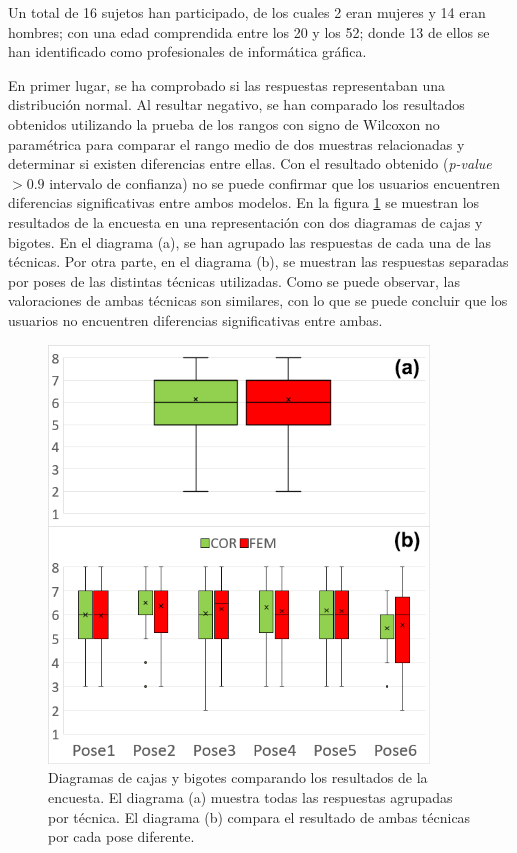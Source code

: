 Un total de 16 sujetos han participado, de los cuales 2 eran mujeres y 14 eran hombres;
con una edad comprendida entre los 20 y los 52; donde 13 de ellos se han identificado como profesionales de informática gráfica.


En primer lugar, se ha comprobado si las respuestas representaban una distribución normal. Al resultar negativo, se han comparado los resultados obtenidos utilizando la prueba de los rangos con signo de Wilcoxon no paramétrica para comparar el rango medio de dos muestras relacionadas y determinar si existen diferencias entre ellas. Con el resultado obtenido (\emph{p-value} $> 0.9$ intervalo de confianza) no se puede confirmar que los usuarios encuentren diferencias significativas entre ambos modelos. 
En la figura \ref{fig:stat} se muestran los resultados de la encuesta en una representación con dos diagramas de cajas y bigotes. En el diagrama (a), se han agrupado las respuestas de cada una de las técnicas. Por otra parte, en el diagrama (b), se muestran las respuestas separadas por poses de las distintas técnicas utilizadas. Como se puede observar, las valoraciones de ambas técnicas son similares, con lo que se puede concluir que los usuarios no encuentren diferencias significativas entre ambas.  
%

%

\begin{figure}[ht]%
   \centering
   \includegraphics[width=0.9\textwidth]{IMG/boxplot}
    \caption{Diagramas de cajas y bigotes comparando los resultados de la encuesta. El diagrama (a) muestra todas las respuestas agrupadas por técnica. El diagrama (b) compara el resultado de ambas técnicas por cada pose diferente.}
\label{fig:stat}
   \end{figure}


